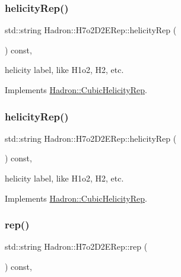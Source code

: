 \subsubsection{\texorpdfstring{helicityRep()}{helicityRep()}\hspace{0.1cm}{\footnotesize\ttfamily [2/3]}}
{\footnotesize\ttfamily std\+::string Hadron\+::\+H7o2\+D2\+E\+Rep\+::helicity\+Rep (\begin{DoxyParamCaption}{ }\end{DoxyParamCaption}) const\hspace{0.3cm}{\ttfamily [inline]}, {\ttfamily [virtual]}}

helicity label, like H1o2, H2, etc. 

Implements \mbox{\hyperlink{structHadron_1_1CubicHelicityRep_af1096946b7470edf0a55451cc662f231}{Hadron\+::\+Cubic\+Helicity\+Rep}}.

\mbox{\label{structHadron_1_1H7o2D2ERep_aa655a9ecae0dbff853de4c341c5da210}} 
\subsubsection{\texorpdfstring{helicityRep()}{helicityRep()}\hspace{0.1cm}{\footnotesize\ttfamily [3/3]}}
{\footnotesize\ttfamily std\+::string Hadron\+::\+H7o2\+D2\+E\+Rep\+::helicity\+Rep (\begin{DoxyParamCaption}{ }\end{DoxyParamCaption}) const\hspace{0.3cm}{\ttfamily [inline]}, {\ttfamily [virtual]}}

helicity label, like H1o2, H2, etc. 

Implements \mbox{\hyperlink{structHadron_1_1CubicHelicityRep_af1096946b7470edf0a55451cc662f231}{Hadron\+::\+Cubic\+Helicity\+Rep}}.

\mbox{\label{structHadron_1_1H7o2D2ERep_abd5db7339f3bf5e389260db649418d0d}} 
\subsubsection{\texorpdfstring{rep()}{rep()}\hspace{0.1cm}{\footnotesize\ttfamily [1/5]}}
{\footnotesize\ttfamily std\+::string Hadron\+::\+H7o2\+D2\+E\+Rep\+::rep (\begin{DoxyParamCaption}{ }\end{DoxyParamCaption}) const\hspace{0.3cm}{\ttfamily [inline]}, {\ttfamily [virtual]}}



